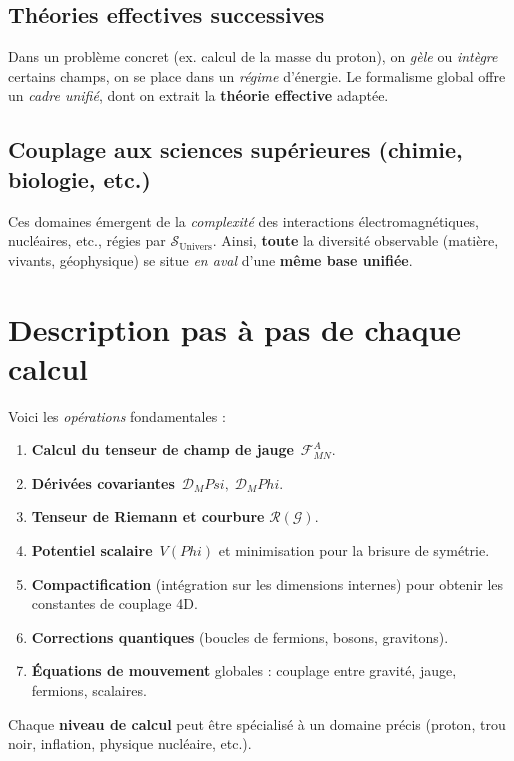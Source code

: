 \documentclass[12pt]{article}
\def\Phi{Phi}%
\def\Psi{Psi}%
\begin{document}
\subsection{Théories effectives successives}
Dans un problème concret (ex. calcul de la masse du proton), on \emph{gèle} 
ou \emph{intègre} certains champs, on se place dans un \emph{régime} d'énergie.  
Le formalisme global offre un \emph{cadre unifié}, dont on extrait la \textbf{théorie effective} adaptée.

\subsection{Couplage aux sciences supérieures (chimie, biologie, etc.)}
Ces domaines émergent de la \emph{complexité} des interactions électromagnétiques, 
nucléaires, etc., régies par \(\mathcal{S}_{\text{Univers}}\).  
Ainsi, \textbf{toute} la diversité observable (matière, vivants, géophysique) 
se situe \emph{en aval} d'une \textbf{même base unifiée}.

\section{Description pas à pas de chaque calcul}
\label{sec:calculs}

Voici les \emph{opérations} fondamentales :

\begin{enumerate}
    \item \textbf{Calcul du tenseur de champ de jauge} 
          \(\,\mathcal{F}_{MN}^A\).  
    \item \textbf{Dérivées covariantes} \(\,\mathcal{D}_M \Psi,\; \mathcal{D}_M \Phi\).  
    \item \textbf{Tenseur de Riemann et courbure} \(\mathcal{R}(\mathcal{G})\).  
    \item \textbf{Potentiel scalaire} \(\,V(\Phi)\) et minimisation pour la brisure de symétrie.  
    \item \textbf{Compactification} (intégration sur les dimensions internes) pour obtenir 
          les constantes de couplage 4D.  
    \item \textbf{Corrections quantiques} (boucles de fermions, bosons, gravitons).  
    \item \textbf{Équations de mouvement} globales : couplage entre gravité, jauge, fermions, scalaires.  
\end{enumerate}

Chaque \textbf{niveau de calcul} peut être spécialisé à un domaine précis 
(proton, trou noir, inflation, physique nucléaire, etc.).
\end{document}
